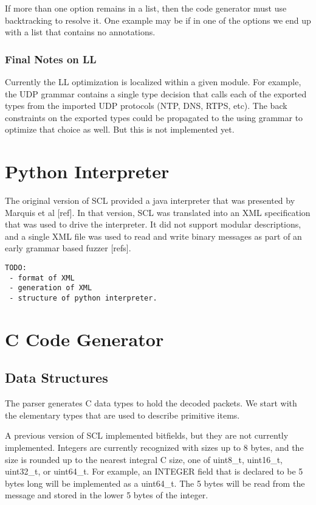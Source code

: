 \documentclass[12pt,oneside,letterpaper]{article}
\begin{document}
If more than one option remains in a list, then the code generator must use backtracking to resolve it. One example may be if in one of the options we end up with a list that contains no annotations.

\subsubsection{Final Notes on LL}
Currently the LL optimization is localized within a given module. For example, the UDP grammar  contains a single type decision that calls each of the exported types from the imported UDP protocols (NTP, DNS, RTPS, etc). The back constraints on the exported types could be propagated to the using grammar to optimize that choice as well. But this is not implemented yet.

\section{Python Interpreter}
The original version of SCL provided a java interpreter  that was presented by Marquis et al [ref]. In that version, SCL was translated into an XML specification that was used to drive the interpreter. It did not support modular descriptions, and a single XML file was used to read and write binary messages as part of an early grammar based fuzzer [refs].

\begin{verbatim}
TODO: 
 - format of XML
 - generation of XML
 - structure of python interpreter.
 \end{verbatim}

\section{C Code Generator}

\subsection{Data Structures}
\label{sec:dataStructures}
The parser generates C data types to hold the decoded packets. We start with the elementary types that are used to describe primitive items.

A previous version of SCL implemented bitfields, but they are not currently implemented. Integers are currently recognized with sizes up to 8 bytes, and the size is rounded up to the nearest integral C size, one of uint8\_t, uint16\_t, uint32\_t, or uint64\_t. For example, an INTEGER field that is declared to be 5 bytes long will be implemented as a uint64\_t. The 5 bytes will be read from the message and stored in the lower 5 bytes of the integer.
\end{document}
